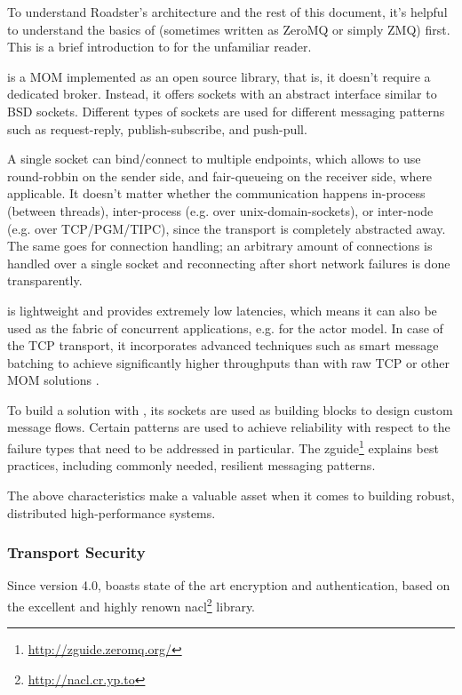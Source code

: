 To understand Roadster's architecture and the rest of this document, it's
helpful to understand the basics of \zmq (sometimes written as ZeroMQ or simply
ZMQ) first. This is a brief introduction to \zmq for the unfamiliar reader.

\zmq is a \gls{MOM} implemented as an open source library, that is, it doesn't
require a dedicated broker. Instead, it offers sockets with an abstract
interface similar to \acrshort{BSD} sockets. Different types of sockets are used for
different messaging patterns such as request-reply, publish-subscribe, and
push-pull.

A single socket can bind/connect to multiple endpoints, which allows \zmq to
use round-robbin on the sender side, and fair-queueing on the receiver side,
where applicable. It doesn't matter whether the communication happens
in-process (between threads), inter-process (e.g. over \glspl{unix-domain-socket}), or
inter-node (e.g. over \acrshort{TCP}/\acrshort{PGM}/\acrshort{TIPC}), since the transport is completely
abstracted away. The same goes for connection handling; an arbitrary amount of
connections is handled over a single socket and reconnecting after short
network failures is done transparently.

\zmq is lightweight and provides extremely low latencies, which means it can
also be used as the fabric of concurrent applications, e.g. for the actor
model. In case of the TCP transport, it incorporates advanced techniques such
as smart message batching to achieve significantly higher throughputs than with
raw TCP or other \gls{MOM} solutions \cite[Figure 2, Middleware evaluation and
prototyping, p.~4]{cern:new-cmw}.

To build a solution with \zmq, its sockets are used as building blocks to
design custom message flows. Certain patterns are used to achieve reliability
with respect to the failure types that need to be addressed in particular.  The
zguide\footnote{\url{http://zguide.zeromq.org/}} explains best practices,
including commonly needed, resilient messaging patterns.

The above characteristics make \zmq a valuable asset when it comes to building
robust, distributed high-performance systems.

\subsubsection{Transport Security}
Since version 4.0, \zmq boasts state of the art encryption and authentication,
based on the excellent and highly renown
\gls{nacl}\footnote{\url{http://nacl.cr.yp.to}} library.

